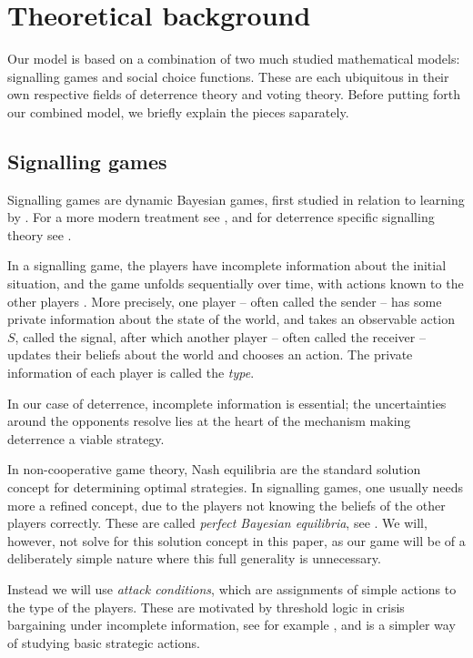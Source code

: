 

\section{Theoretical background}
Our model is based on a combination of two much studied mathematical models: signalling games and social choice functions. These are each ubiquitous in their own respective fields of deterrence theory and voting theory. Before putting forth our combined model, we briefly explain the pieces saparately.

\subsection{Signalling games}
Signalling games are dynamic Bayesian games, first studied in relation to learning by \textcite{Lewis_1969}. For a more modern treatment see \parencite{Fudenberg-Tirole_1991}, and for deterrence specific signalling theory see \parencite{Schelling_1960}. 

In a signalling game, the players have incomplete information about the initial situation, and the game unfolds sequentially over time, with actions known to the other players \parencite{Fudenberg-Tirole_1991}. More precisely, one player -- often called the sender -- has some private information about the state of the world, and takes an observable action $S$, called the signal, after which another player -- often called the receiver -- updates their beliefs about the world and chooses an action. The private information of each player is called the \emph{type}. 

In our case of deterrence, incomplete information is essential; the uncertainties around the opponents resolve lies at the heart of the mechanism making deterrence a viable strategy. 

In non-cooperative game theory, Nash equilibria are the standard solution concept for determining optimal strategies. In signalling games, one usually needs more a refined concept, due to the players not knowing the beliefs of the other players correctly. These are called \emph{perfect Bayesian equilibria}, see \parencite{Fudenberg-Tirole_1991_paper}. We will, however, not solve for this solution concept in this paper, as our game will be of a deliberately simple nature where this full generality is unnecessary. 

Instead we will use \emph{attack conditions}, which are assignments of simple actions to the type of the players. These are motivated by threshold logic in crisis bargaining under incomplete information, see for example \parencite{Fearon_1995}, and is a simpler way of studying basic strategic actions. 

